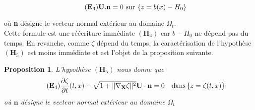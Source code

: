 \documentclass[12pt,a4paper]{article}
\newtheorem{prop}[dfn]{\textbf{Proposition}}
\numberwithin{equation}{section}
\begin{document}
\begin{equation}
    \tag{${\textbf{E}}_3$} \label{eq_E2}
    \textbf{U}.\textbf{n} = 0 \text{  sur }\{z = b(x)-H_0\}
\end{equation} 

où \textbf{n} désigne le vecteur normal extérieur au domaine $\Omega_t$.\\

Cette formule est une réécriture immédiate $(\textbf{H}_4)$  car $b-H_0$ ne dépend pas du temps. En revanche, comme $\zeta$ dépend du temps, la caractérisation de l'hypothèse $(\textbf{H}_5)$ est moins immédiate et est l'objet de la proposition suivante.



\begin{prop} L'hypothèse $(\textbf{H}_5)$ nous donne que
    \begin{equation} \tag{$\textbf{E}_4$} \label{eq_E3}
        \frac{\partial \zeta}{\partial t}(t,x) - \sqrt{1+ \| \nabla_\textbf{X}\zeta\|^2} \textbf{U} \cdot \textbf{n} = 0 \quad\text{dans}\,\{z = \zeta(t,x)\}
    \end{equation}
    où $\textbf{n}$ désigne le vecteur normal extérieur au domaine $\Omega_t$
\end{prop}
\end{document}
